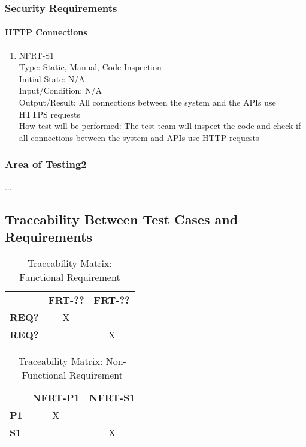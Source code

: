 \documentclass[12pt, titlepage]{article}
\begin{document}
\subsubsection{Security Requirements}
\paragraph{HTTP Connections}
\begin{enumerate}

\item{NFRT-S1}\\
Type: Static, Manual, Code Inspection\\
Initial State: N/A\\
Input/Condition: N/A\\
Output/Result: All connections between the system and the APIs use HTTPS requests\\
How test will be performed: The test team will inspect the code and check if all connections between the system and APIs use HTTP requests
\end{enumerate}

\subsubsection{Area of Testing2}

...

\subsection{Traceability Between Test Cases and Requirements}
\begin{table}[H]
    \centering
    \caption{Traceability Matrix: Functional Requirement}
    \begin{tabular}{lcc}
        ~ & \textbf{FRT-??} & \textbf{FRT-??}\\
        \textbf{REQ?} & X & ~\\
        \textbf{REQ?} & ~ & X\\
    \end{tabular}
    \label{Traceability Matrix: Functional Requirement}
\end{table}

\begin{table}[H]
    \centering
    \caption{Traceability Matrix: Non-Functional Requirement}
    \begin{tabular}{lcc}
        ~ & \textbf{NFRT-P1} & \textbf{NFRT-S1}\\
        \textbf{P1} & X & ~\\
        \textbf{S1} & ~ & X\\
    \end{tabular}
    \label{Traceability Matrix: Non-Functional Requirement}
\end{table}
\end{document}
